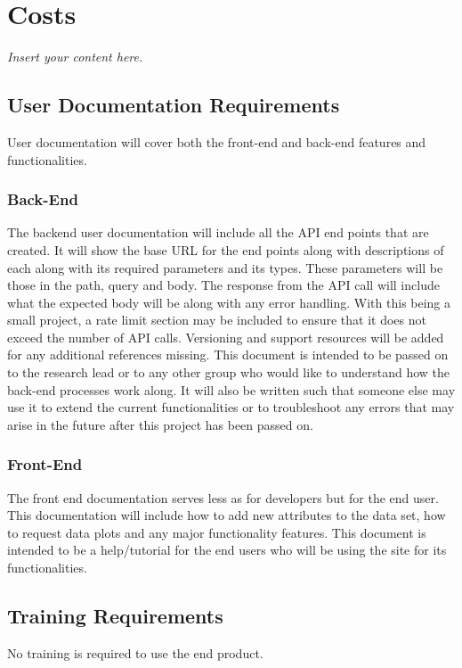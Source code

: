 \documentclass[12pt]{article}
\newcommand{\lips}{\textit{Insert your content here.}}
\begin{document}
\section{Costs}
\lips
\subsection{User Documentation Requirements}
User documentation will cover both the front-end and back-end features and functionalities.
\subsubsection{Back-End}
The backend user documentation will include all the API end points that are created. \newline
It will show the base URL for the end points along with descriptions of each
along with its required parameters and its types. These parameters will be those
in the path, query and body. The response from the API call will include what
the expected body will be along with any error handling. With this being a small
project, a rate limit section may be included to ensure that it does not exceed
the number of API calls. Versioning and support resources will be added for any
additional references missing. \newline
This document is intended to be passed on to the research lead or to any other
group who would like to understand how the back-end processes work along. It
will also be written such that someone else may use it to extend the current
functionalities or to troubleshoot any errors that may arise in the future after
this project has been passed on. 

\subsubsection{Front-End}
The front end documentation serves less as for developers but for the end user.
This documentation will include how to add new attributes to the data set, how
to request data plots and any major functionality features. \newline
This document is intended to be a help/tutorial for the end users who will be
using the site for its functionalities.

\subsection{Training Requirements}
No training is required to use the end product. 
\end{document}
